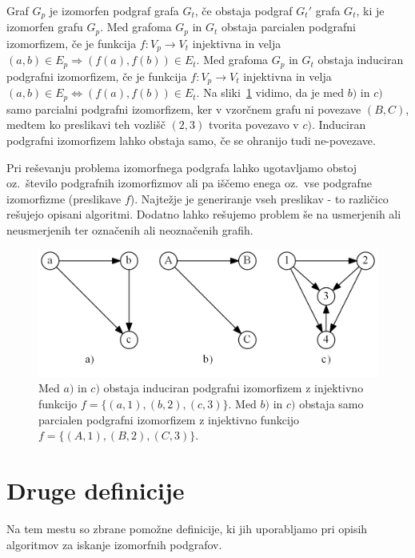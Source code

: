 \documentclass[a4paper, 12pt, ]{book}
\begin{document}
	Graf $G_p$ je izomorfen podgraf grafa $G_t$, če obstaja podgraf $G_t'$ grafa $G_t$, ki je izomorfen grafu $G_p$.
	Med grafoma $G_p$ in $G_t$ obstaja parcialen podgrafni izomorfizem, če je funkcija $f: V_p \to V_t$ injektivna in velja
	$(a,b) \in E_p \Rightarrow (f(a), f(b)) \in E_t$.
	Med grafoma $G_p$ in $G_t$ obstaja induciran podgrafni izomorfizem, če je funkcija $f: V_p \to V_t$ injektivna in velja
	$(a,b) \in E_p \Leftrightarrow (f(a), f(b)) \in E_t$. Na sliki~\ref{pic_sub_iso} vidimo, da je med $b)$ in $c)$ samo parcialni podgrafni
	izomorfizem, ker v vzorčnem grafu ni povezave $(B, C)$, medtem ko preslikavi teh vozlišč $(2, 3)$ tvorita povezavo v $c)$. Induciran 
	podgrafni izomorfizem lahko obstaja samo, če se ohranijo tudi ne-povezave.
	
	Pri reševanju problema izomorfnega podgrafa lahko ugotavljamo obstoj oz.~število podgrafnih izomorfizmov ali pa iščemo enega oz.~vse
	podgrafne izomorfizme (preslikave $f$). Najtežje je generiranje vseh preslikav - to različico rešujejo opisani algoritmi. Dodatno lahko rešujemo
	problem še na usmerjenih ali neusmerjenih ter označenih ali neoznačenih grafih.


	\begin{figure}
	\begin{center}
	\includegraphics[width=15cm]{img/graph_sub_izomorph.png}
	\end{center}
	\caption{Med $a)$ in $c)$ obstaja induciran podgrafni izomorfizem z injektivno funkcijo $f = \{(a, 1), (b, 2), (c, 3)\}$. Med $b)$ in $c)$ obstaja
	samo parcialen podgrafni izomorfizem z injektivno funkcijo $f = \{(A, 1), (B, 2), (C, 3)\}$.}
	\label{pic_sub_iso}
	\end{figure}



	\section{Druge definicije}

	Na tem mestu so zbrane pomožne definicije, ki jih uporabljamo pri opisih algoritmov za iskanje izomorfnih podgrafov.
\end{document}
